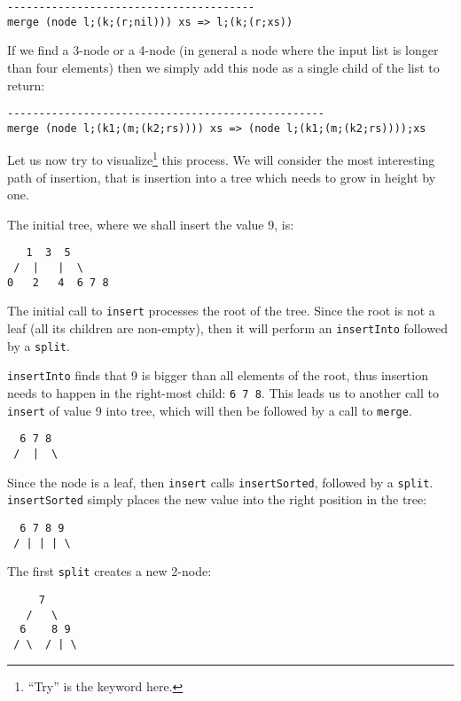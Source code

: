 \begin{lstlisting}
---------------------------------------
merge (node l;(k;(r;nil))) xs => l;(k;(r;xs))
\end{lstlisting}

If we find a 3-node or a 4-node (in general a node where the input list is longer than four elements) then we simply add this node as a single child of the list to return:

\begin{lstlisting}
--------------------------------------------------
merge (node l;(k1;(m;(k2;rs)))) xs => (node l;(k1;(m;(k2;rs))));xs
\end{lstlisting}


Let us now try to visualize\footnote{``Try'' is the keyword here.} this process. We will consider the most interesting path of insertion, that is insertion into a tree which needs to grow in height by one.

The initial tree, where we shall insert the value 9, is:

\begin{lstlisting}
   1  3  5
 /  |   |  \
0   2   4  6 7 8
\end{lstlisting}

The initial call to \texttt{insert} processes the root of the tree. Since the root is not a leaf (all its children are non-empty), then it will perform an \texttt{insertInto} followed by a \texttt{split}.

\texttt{insertInto} finds that 9 is bigger than all elements of the root, thus insertion needs to happen in the right-most child: \texttt{6 7 8}. This leads us to another call to \texttt{insert} of value 9 into tree, which will then be followed by a call to \texttt{merge}.

\begin{lstlisting}
  6 7 8
 /  |  \
\end{lstlisting}

Since the node is a leaf, then \texttt{insert} calls \texttt{insertSorted}, followed by a \texttt{split}. \texttt{insertSorted} simply places the new value into the right position in the tree:

\begin{lstlisting}
  6 7 8 9
 / | | | \
\end{lstlisting}

The first \texttt{split} creates a new 2-node:

\begin{lstlisting}
     7
   /   \
  6    8 9
 / \  / | \
\end{lstlisting}

